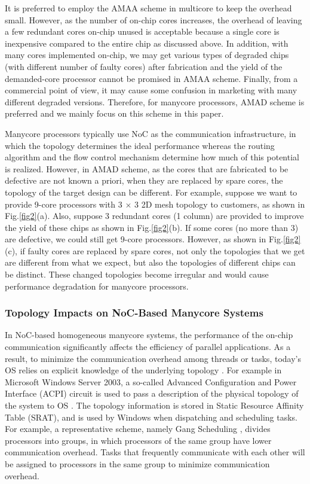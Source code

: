 It is preferred to employ the AMAA scheme in multicore to keep the overhead small. However, as the number of on-chip cores increases, the overhead of leaving a few redundant cores on-chip unused is acceptable because a single core is inexpensive compared to the entire chip as discussed above. In addition, with many cores implemented on-chip, we may get various types of degraded chips (with different number of faulty cores) after fabrication and the yield of the demanded-core processor cannot be promised in AMAA scheme. Finally, from a commercial point of view, it may cause some confusion in marketing with many different degraded versions. Therefore, for manycore processors, AMAD scheme is preferred and we mainly focus on this scheme in this paper.

Manycore processors typically use NoC as the communication infrastructure, in which the topology determines the ideal performance whereas the routing algorithm and the flow control mechanism determine how much of this potential is realized. However, in AMAD scheme, as the cores that are fabricated to be defective are not known a priori, when they are replaced by spare cores, the topology of the target design can be different. For example, suppose we want to provide 9-core processors with 3 $\times$ 3 2D mesh topology to customers, as shown in Fig.\ref{fig2}(a). Also, suppose 3 redundant cores (1 column) are provided to improve the yield of these chips as shown in Fig.\ref{fig2}(b). If some cores (no more than 3) are defective, we could still get 9-core processors. However, as shown in Fig.\ref{fig2}(c), if faulty cores are replaced by spare cores, not only the topologies that we get are different from what we expect, but also the topologies of different chips can be distinct. These changed topologies become irregular and would cause performance degradation for manycore processors.

\subsubsection{Topology Impacts on NoC-Based Manycore Systems}

In NoC-based homogeneous manycore systems, the performance of the on-chip communication significantly affects the efficiency of parallel applications. As a result, to minimize the communication overhead among threads or tasks, today’s OS relies on explicit knowledge of the underlying topology \cite{stallings2012operating}. For example in Microsoft Windows Server 2003, a so-called Advanced Configuration and Power Interface (ACPI) circuit is used to pass a description of the physical topology of the system to OS \cite{Microsoft2007numa}. The topology information is stored in Static Resource Affinity Table (SRAT), and is used by Windows when dispatching and scheduling tasks. For example, a representative scheme, namely Gang Scheduling \cite{gupta1991impact}, divides processors into groups, in which processors of the same group have lower communication overhead. Tasks that frequently communicate with each other will be assigned to processors in the same group to minimize communication overhead.


